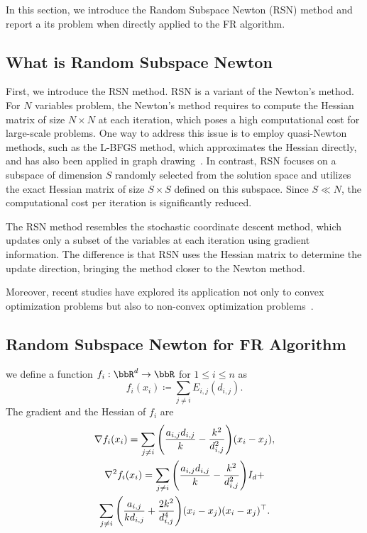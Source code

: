 \documentclass[dvipdfmx,journal]{IEEEtran}
\newcommand{\defeq}{\coloneqq}
\begin{document}
In this section, we introduce the Random Subspace Newton (RSN) method and report a its problem when directly applied to the FR algorithm.

\subsection{What is Random Subspace Newton}

First, we introduce the RSN method.
RSN is a variant of the Newton's method.
For $N$ variables problem, the Newton's method requires to compute the Hessian matrix of size $N \times N$ at each iteration, which poses a high computational cost for large-scale problems.
One way to address this issue is to employ quasi-Newton methods, such as the L-BFGS method, which approximates the Hessian directly, and has also been applied in graph drawing~\cite{6183577}.
In contrast, RSN focuses on a subspace of dimension $S$ randomly selected from the solution space and utilizes the exact Hessian matrix of size $S \times S$ defined on this subspace.
Since $S \ll N$, the computational cost per iteration is significantly reduced.

The RSN method resembles the stochastic coordinate descent method, which updates only a subset of the variables at each iteration using gradient information. The difference is that RSN uses the Hessian matrix to determine the update direction, bringing the method closer to the Newton method.

Moreover, recent studies have explored its application not only to convex optimization problems but also to non-convex optimization problems~\cite{fujiRandomizedSubspaceRegularized2022}.

\subsection{Random Subspace Newton for FR Algorithm}

we define a function $f_i: \bbR^{d} \to \bbR$ for $1 \leq i \leq n$ as
\begin{equation*}
  f_i(x_i) \defeq \sum_{j \neq i} E_{i,j}(d_{i,j}).
\end{equation*}
The gradient and the Hessian of $f_i$ are
\begin{gather*}
  \nabla f_i(x_i) = \sum_{j \neq i} \qty(\frac{a_{i,j}d_{i,j}}{k} - \frac{k^2}{d_{i,j}^2}) (x_i-x_j), \\
  \nabla^2 f_i(x_i) = \sum_{j \neq i} \qty(\frac{a_{i,j}d_{i,j}}{k} - \frac{k^2}{d_{i,j}^2}) I_d +      \\
  \sum_{j \neq i} \qty(\frac{a_{i,j}}{k d_{i,j}} + \frac{2k^2}{d_{i,j}^4}) (x_i - x_j)(x_i - x_j)^\top.
\end{gather*}
\end{document}
